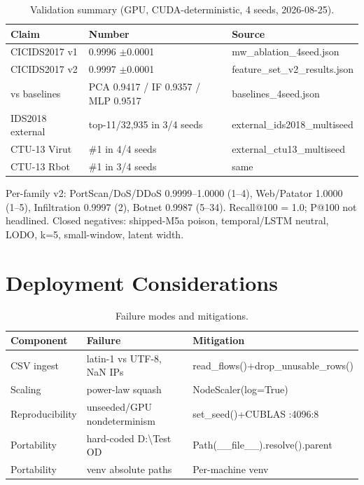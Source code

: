 \documentclass[12pt,a4paper,oneside]{report}
\newcommand{\bluetableheader}{\rowcolor{headerblue}\color{white}\bfseries}
\begin{document}
\begin{table}[H]
\centering
\caption{Validation summary (GPU, CUDA-deterministic, 4 seeds, 2026-08-25).}
\label{tab:4.2}
\begin{tabular}{|L{4cm}|L{4cm}|L{6.5cm}|}
\hline
\bluetableheader Claim & Number & Source \\ \hline
{} CICIDS2017 v1 & 0.9996 $\pm$0.0001 & mw\_ablation\_4seed.json \\ \hline
CICIDS2017 v2 & 0.9997 $\pm$0.0001 & feature\_set\_v2\_results.json \\ \hline
{} vs baselines & PCA 0.9417 / IF 0.9357 / MLP 0.9517 & baselines\_4seed.json \\ \hline
IDS2018 external & top-11/32,935 in 3/4 seeds & external\_ids2018\_multiseed \\ \hline
{} CTU-13 Virut & \#1 in 4/4 seeds & external\_ctu13\_multiseed \\ \hline
CTU-13 Rbot & \#1 in 3/4 seeds & same \\ \hline
\end{tabular}
\end{table}

Per-family v2: PortScan/DoS/DDoS 0.9999--1.0000 (1--4), Web/Patator 1.0000 (1--5), Infiltration 0.9997 (2), Botnet 0.9987 (5--34). Recall@100 = 1.0; P@100 not headlined. Closed negatives: shipped-M5a poison, temporal/LSTM neutral, LODO, k=5, small-window, latent width.

\section{Deployment Considerations}

\begin{table}[H]
\centering
\caption{Failure modes and mitigations.}
\label{tab:4.3}
\begin{tabular}{|L{3.2cm}|L{5.5cm}|L{5.8cm}|}
\hline
\bluetableheader Component & Failure & Mitigation \\ \hline
{} CSV ingest & latin-1 vs UTF-8, NaN IPs & read\_flows()+drop\_unusable\_rows() \\ \hline
Scaling & power-law squash & NodeScaler(log=True) \\ \hline
{} Reproducibility & unseeded/GPU nondeterminism & set\_seed()+CUBLAS :4096:8 \\ \hline
Portability & hard-coded D:\textbackslash Test OD & Path(\_\_file\_\_).resolve().parent \\ \hline
{} Portability & venv absolute paths & Per-machine venv \\ \hline
\end{tabular}
\end{table}
\end{document}
